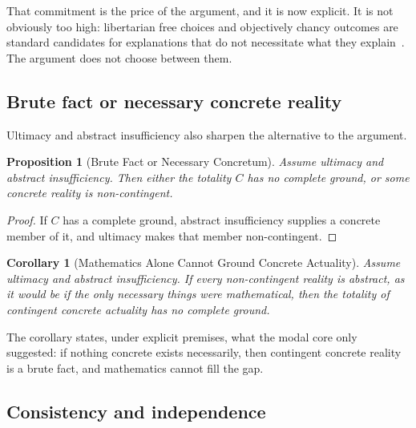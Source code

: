 \documentclass[11pt,letterpaper]{article}
\theoremstyle{plain}
\newtheorem{proposition}{Proposition}
\newtheorem{corollary}{Corollary}
\theoremstyle{definition}
\begin{document}
That commitment is the price of the argument, and it is now explicit. It is not obviously too high: libertarian free choices and objectively chancy outcomes are standard candidates for explanations that do not necessitate what they explain~\cite{pruss}. The argument does not choose between them.

\subsection{Brute fact or necessary concrete reality}

Ultimacy and abstract insufficiency also sharpen the alternative to the argument.

\begin{proposition}[Brute Fact or Necessary Concretum]\label{prop:dilemma}
Assume ultimacy and abstract insufficiency. Then either the totality $C$ has no complete ground, or some concrete reality is non-contingent.
\end{proposition}

\begin{proof}
If $C$ has a complete ground, abstract insufficiency supplies a concrete member of it, and ultimacy makes that member non-contingent.
\end{proof}

\begin{corollary}[Mathematics Alone Cannot Ground Concrete Actuality]\label{cor:math}
Assume ultimacy and abstract insufficiency. If every non-contingent reality is abstract, as it would be if the only necessary things were mathematical, then the totality of contingent concrete actuality has no complete ground.
\end{corollary}

The corollary states, under explicit premises, what the modal core only suggested: if nothing concrete exists necessarily, then contingent concrete reality is a brute fact, and mathematics cannot fill the gap.

\subsection{Consistency and independence}
\label{sec:consistency}
\end{document}
